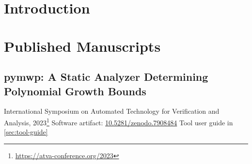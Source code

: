 \documentclass[letterpaper,11pt]{report}
\title{\EDSTITLE}
\author{\EDSAUTHOR}
\date{\today}
\begin{document}
\maketitle\clearpage
\clearpage
\clearpage
\tableofcontents\clearpage
\listoftables\clearpage
\listoffigures\clearpage

\setcounter{chapter}{0}
\chapter{Introduction}\label{ch:introduction}


\chapter{Published Manuscripts}\label{ch:published-manuscripts}\clearpage

\section{pymwp: A Static Analyzer Determining Polynomial Growth Bounds}\label{sec:atva}

{International Symposium on Automated Technology for Verification and Analysis, 2023\footnote{\url{https://atva-conference.org/2023}}}
{\noindent Software artifact: \href{https://doi.org/10.5281/zenodo.7908484}{10.5281/zenodo.7908484}
\newline\noindent Tool user guide in \autoref{sec:tool-guide}}



\end{document}
